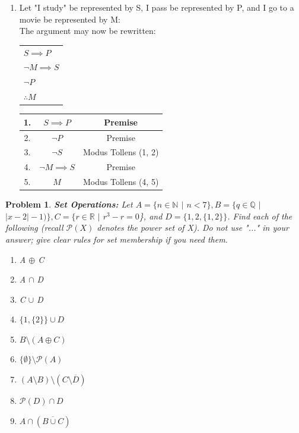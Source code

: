 \documentclass{article}
\newtheorem{problem}{Problem}
\theoremstyle{definition}
\begin{document}
\begin{enumerate}[label = \alph*)]
    \item
    Let "I study" be represented by S, I pass be represented by P, and I go to a movie be represented by M: \\
    The argument may now be rewritten:\\
    \begin{tabular}{l}
         $S\implies P$\\
         $\neg M \implies S$\\
         $\neg P$ \\ \hline
         $\therefore M$
    \end{tabular}
    
    \begin{tabular}{|c c|c|}
        \hline
         1. & $S\implies P$ & Premise \\ \hline
         2. & $\neg P$ & Premise \\  \hline
         3. & $\neg S$ & Modus Tollens (1, 2) \\ \hline
         4. & $\neg M \implies S$ & Premise \\ \hline
         5. & $M$ & Modus Tollens (4, 5) \\ \hline
    \end{tabular}
\end{enumerate}

\begin{problem}
\textbf{Set Operations:} Let $A=\{n\in \mathbb{N}$ $|$ $n<7\}, B=\{q\in \mathbb{Q}$ $|$ $|x-2| -1)\}, C = \{r\in \mathbb{R}$ $|$ $r^3-r=0$\}, and $D = \{1,2,\{1, 2\}\}$. Find each of the following (recall $\mathcal{P}(X)$ denotes the power set of X). Do not use "..." in your answer; give clear rules for set membership if you need them.
\begin{enumerate}[label = \alph*)]
    \item A $\oplus$ C
    
    \item A $\cap$ D
    
    \item C $\cup$ D
    
    \item $\{1, \{2\} \} \cup D$
    
    \item $B \setminus (A \oplus C)$
    
    \item $\{ \emptyset \} \setminus \mathcal{P}(A)$
    
    \item $(A \setminus B) \setminus (C \setminus \overline{D})$
    
    \item $\mathcal{P}(D) \cap D$
    
    \item $A \cap (\overline{B \cup C})$
    
\end{enumerate}
\end{problem}
\end{document}
